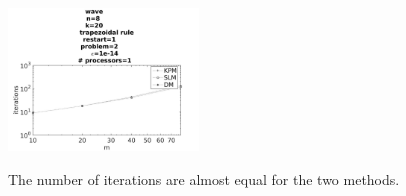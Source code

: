 


\begin{figure}[H]
        \centering

                \includegraphics[width=0.45\textwidth]{../MATLAB/fig/vresultiter.jpg}
        \label{fig:vresultiter}
        \caption{The number of iterations are almost equal for the two methods.}
\end{figure}

